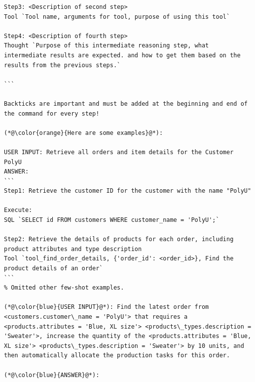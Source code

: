 \documentclass[preprint,12pt]{elsarticle}
\begin{document}
\begin{lstlisting}[style=prompt, label={lst:plan_prompt},caption={Prompt for generating the planned multi-step Operations},aboveskip=0pt, belowskip=0pt]
Step3: <Description of second step>
Tool `Tool name, arguments for tool, purpose of using this tool`

Step4: <Description of fourth step>
Thought `Purpose of this intermediate reasoning step, what intermediate results are expected. and how to get them based on the results from the previous steps.`

```

Backticks are important and must be added at the beginning and end of the command for every step!

(*@\color{orange}{Here are some examples}@*):

USER INPUT: Retrieve all orders and item details for the Customer PolyU
ANSWER:
```
Step1: Retrieve the customer ID for the customer with the name "PolyU"

Execute:
SQL `SELECT id FROM customers WHERE customer_name = 'PolyU';`

Step2: Retrieve the details of products for each order, including product attributes and type description
Tool `tool_find_order_details, {'order_id': <order_id>}, Find the product details of an order`
```
% Omitted other few-shot examples.

(*@\color{blue}{USER INPUT}@*): Find the latest order from <customers.customer\_name = 'PolyU'> that requires a <products.attributes = 'Blue, XL size'> <products\_types.description = 'Sweater'>, increase the quantity of the <products.attributes = 'Blue, XL size'> <products\_types.description = 'Sweater'> by 10 units, and then automatically allocate the production tasks for this order.

(*@\color{blue}{ANSWER}@*): 
\end{lstlisting}
\end{document}

